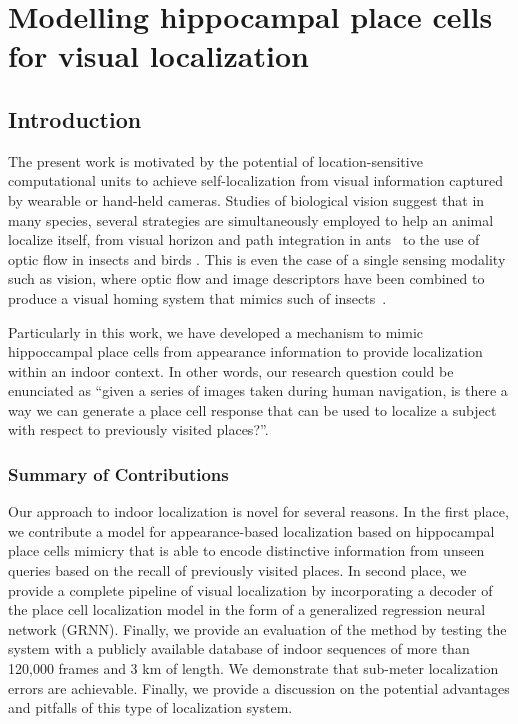\chapter{Modelling hippocampal place cells for visual localization}\label{ch:chapter5} %


\section{Introduction}

The present work is motivated by the potential of location-sensitive computational units to achieve self-localization from visual information captured by wearable or hand-held cameras.  Studies of biological vision suggest that in many species, several strategies are simultaneously employed to help an animal localize itself, from visual horizon and path integration in ants~\cite{narendra2013mapping} to the use of optic flow in insects and birds \cite{krapp2000neuronal, bhagavatula2011optic}. This is even the case of a single sensing modality such as vision, where optic flow and image descriptors have been combined to produce a visual homing system that mimics such of insects~\cite{vardy2005biologically}.

Particularly in this work, we have developed a mechanism to mimic hippoccampal place cells from appearance information to provide localization within an indoor context. In other words, our research question could be enunciated as ``given a series of images taken during human navigation, is there a way we can generate a place cell response that can be used to localize a subject with respect to previously visited places?''.
\vspace{-0.5cm}

\subsection{Summary of Contributions}

Our approach to indoor localization is novel for several reasons. In the first place, we contribute a model for appearance-based localization based on hippocampal place cells mimicry that is able to encode distinctive information from unseen queries based on the recall of previously visited places. In second place, we provide a complete pipeline of visual localization by incorporating a decoder of the place cell localization model in the form of a generalized regression neural network (GRNN). Finally, we provide an evaluation of the method by testing the system with a publicly available database of indoor sequences of more than 120,000 frames and 3 km of length. We demonstrate that sub-meter localization errors are achievable. Finally, we provide a discussion on the potential advantages and pitfalls of this type of localization system.


